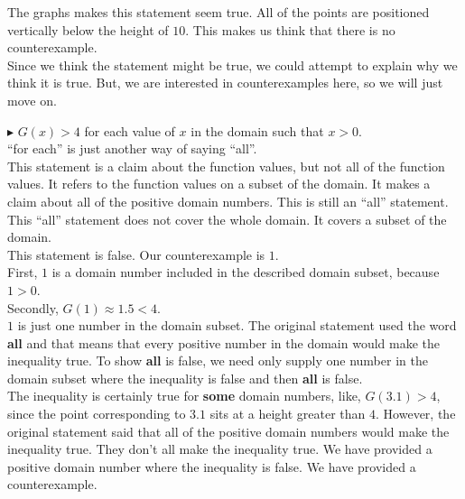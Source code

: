 \documentclass{ximera}
\begin{document}
The graphs makes this statement seem true.  All of the points are positioned vertically below the height of $10$.  This makes us think that there is no counterexample.  \\

Since we think the statement might be true, we could attempt to explain why we think it is true.  But, we are interested in counterexamples here, so we will just move on.















\textbf{\textcolor{red!70!darkgray}{$\blacktriangleright$}} $G(x) > 4$ for each value of $x$ in the domain such that $x > 0$. \\



``for each'' is just another way of saying ``all''.\\

This statement is a claim about the function values, but not all of the function values.  It refers to the function values on a subset of the domain.  It makes a claim about all of the positive domain numbers. This is still an ``all'' statement.  This ``all'' statement does not cover the whole domain.  It covers a subset of the domain.\\



This statement is false. Our counterexample is $1$.  \\


First, $1$ is a domain number included in the described domain subset, because $1 > 0$. \\


Secondly, $G(1) \approx 1.5 < 4$. \\



$1$ is just one number in the domain subset.   The original statement used the word \textbf{all} and that means that every positive number in the domain would make the inequality true.  To show \textbf{all} is false, we need only supply one number in the domain subset where the inequality is false and then \textbf{all} is false. \\

The inequality is certainly true for \textbf{some} domain numbers, like, $G(3.1) > 4$, since the point corresponding to $3.1$ sits at a height greater than $4$.  However, the original statement said that all of the positive domain numbers would make the inequality true. They don't all make the inequality true.  We have provided a positive domain number where the inequality is false. We have provided a counterexample. \\
\end{document}
